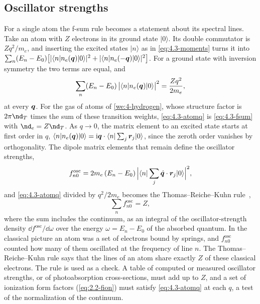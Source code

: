 \subsection{Oscillator strengths}

For a single atom the f-sum rule becomes a statement about its spectral lines. Take an atom with $Z$ electrons in its ground state $|0\rangle$. Its double commutator is $Zq^2/m_e$, and inserting the excited states $|n\rangle$ as in \cref{eq:4.3-moments} turns it into $\sum_n(E_n - E_0)\bigl[|\langle n|n_e(\bm{q})|0\rangle|^2 + |\langle n|n_e(-\bm{q})|0\rangle|^2\bigr]$. For a ground state with inversion symmetry the two terms are equal, and
\begin{equation}
  \sum_n(E_n - E_0)\,\bigl|\langle n|n_e(\bm{q})|0\rangle\bigr|^2 = \frac{Zq^2}{2m_e} ,
  \label{eq:4.3-atomq}
\end{equation}
at every $\bm{q}$. For the gas of atoms of \cref{we:4-hydrogen}, whose structure factor is $2\pi\nd_T$ times the sum of these transition weights, \cref{eq:4.3-atomq} is \cref{eq:4.3-fsum} with $\nd_e = Z\nd_T$. As $q \to 0$, the matrix element to an excited state starts at first order in $q$, $\langle n|n_e(\bm{q})|0\rangle = \mathrm{i}\bm{q}\cdot\langle n|\sum_j\bm{r}_j|0\rangle$, since the zeroth order vanishes by orthogonality. The dipole matrix elements that remain define the oscillator strengths,
\begin{equation}
  f^{\mathrm{osc}}_{n0} = 2m_e\,(E_n - E_0)\,\Bigl|\langle n|\sum_j\hat{\bm{q}}\cdot\bm{r}_j|0\rangle\Bigr|^2 ,
  \label{eq:4.3-osc}
\end{equation}
and \cref{eq:4.3-atomq} divided by $q^2/2m_e$ becomes the Thomas--Reiche--Kuhn rule~\cite{thomas1925zahl,reiche1925zahl,kuhn1925gesamtstarke},
\begin{equation}
  \sum_nf^{\mathrm{osc}}_{n0} = Z ,
  \label{eq:4.3-TRK}
\end{equation}
where the sum includes the continuum, as an integral of the oscillator-strength density $\dd f^{\mathrm{osc}}/\dd\omega$ over the energy $\omega = E_n - E_0$ of the absorbed quantum. In the classical picture an atom was a set of electrons bound by springs, and $f^{\mathrm{osc}}_{n0}$ counted how many of them oscillated at the frequency of line $n$. The Thomas--Reiche--Kuhn rule says that the lines of an atom share exactly $Z$ of these classical electrons. The rule is used as a check. A table of computed or measured oscillator strengths, or of photoabsorption cross-sections, must add up to $Z$, and a set of ionization form factors (\cref{eq:2.2-fion}) must satisfy \cref{eq:4.3-atomq} at each $q$, a test of the normalization of the continuum.

